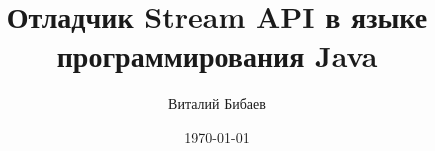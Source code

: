 \documentclass{beamer}
\title[]{Отладчик Stream API в языке программирования Java} %
\author{Виталий Бибаев} %
\institute[СПБАУ] %
{
Санкт-Петербургский академический университет \\ %
\medskip
\textit{vitaliy.bibaev@gmail.com} %
}
\date{\today} %
\begin{document}
\begin{frame}
\titlepage %
\end{frame}




%
\end{document}
